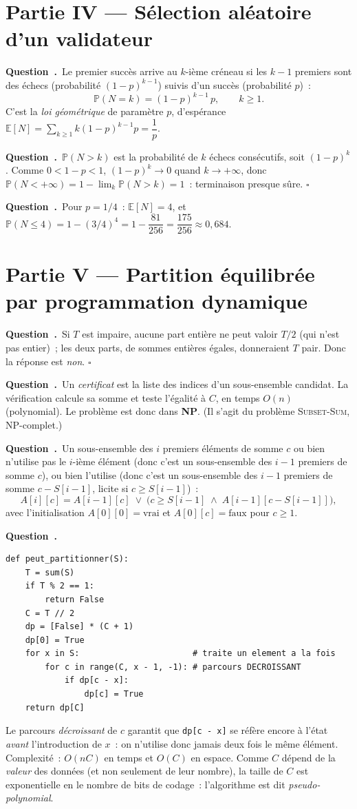 \documentclass[11pt,a4paper]{article}
\newcounter{qcnt}
\newcommand{\Q}{\medskip\par\stepcounter{qcnt}\noindent\textbf{Question~\theqcnt.}~}
\newcommand{\code}[1]{\lstinline!#1!}
\begin{document}
\section*{Partie IV --- Sélection aléatoire d'un validateur}

\Q Le premier succès arrive au $k$-ième créneau si les $k-1$ premiers sont des échecs
(probabilité $(1-p)^{k-1}$) suivis d'un succès (probabilité $p$)~:
$$\mathbb{P}(N = k) = (1-p)^{k-1}\,p, \qquad k \ge 1.$$
C'est la \emph{loi géométrique} de paramètre $p$, d'espérance
$\mathbb{E}[N] = \sum_{k\ge1} k (1-p)^{k-1} p = \dfrac{1}{p}.$

\Q $\mathbb{P}(N > k)$ est la probabilité de $k$ échecs consécutifs, soit $(1-p)^{k}$. Comme
$0 < 1-p < 1$, $(1-p)^{k} \to 0$ quand $k \to +\infty$, donc
$\mathbb{P}(N < +\infty) = 1 - \lim_k \mathbb{P}(N>k) = 1$~: terminaison presque sûre. $\square$

\Q Pour $p = 1/4$~: $\mathbb{E}[N] = 4$, et
$\mathbb{P}(N \le 4) = 1 - (3/4)^{4} = 1 - \dfrac{81}{256} = \dfrac{175}{256}
\approx 0{,}684.$

\section*{Partie V --- Partition équilibrée par programmation dynamique}

\Q Si $T$ est impaire, aucune part entière ne peut valoir $T/2$ (qui n'est pas entier)~; les deux
parts, de sommes entières égales, donneraient $T$ pair. Donc la réponse est \emph{non}. $\square$

\Q Un \emph{certificat} est la liste des indices d'un sous-ensemble candidat. La vérification
calcule sa somme et teste l'égalité à $C$, en temps $O(n)$ (polynomial). Le problème est donc
dans \textbf{NP}. (Il s'agit du problème \textsc{Subset-Sum}, NP-complet.)

\Q Un sous-ensemble des $i$ premiers éléments de somme $c$ ou bien n'utilise pas le $i$-ième
élément (donc c'est un sous-ensemble des $i-1$ premiers de somme $c$), ou bien l'utilise (donc
c'est un sous-ensemble des $i-1$ premiers de somme $c - S[i-1]$, licite si $c \ge S[i-1]$)~:
$$A[i][c] = A[i-1][c] \;\lor\; \bigl(c \ge S[i-1] \;\land\; A[i-1][c - S[i-1]]\bigr),$$
avec l'initialisation $A[0][0] = \text{vrai}$ et $A[0][c] = \text{faux}$ pour $c \ge 1$.

\Q
\begin{lstlisting}
def peut_partitionner(S):
    T = sum(S)
    if T % 2 == 1:
        return False
    C = T // 2
    dp = [False] * (C + 1)
    dp[0] = True
    for x in S:                       # traite un element a la fois
        for c in range(C, x - 1, -1): # parcours DECROISSANT
            if dp[c - x]:
                dp[c] = True
    return dp[C]
\end{lstlisting}
Le parcours \emph{décroissant} de $c$ garantit que \code{dp[c - x]} se réfère encore à l'état
\emph{avant} l'introduction de $x$~: on n'utilise donc jamais deux fois le même élément.
Complexité~: $O(nC)$ en temps et $O(C)$ en espace. Comme $C$ dépend de la \emph{valeur} des
données (et non seulement de leur nombre), la taille de $C$ est exponentielle en le nombre de bits
de codage~: l'algorithme est dit \emph{pseudo-polynomial}.
\end{document}
